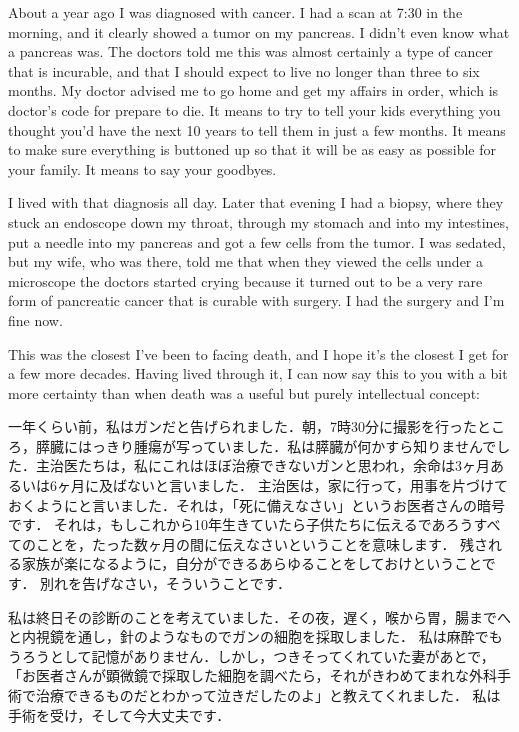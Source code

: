 \documentclass[twocolumn]{jsarticle}
\begin{document}
\newpage

About a year ago I was diagnosed with cancer. I had a scan at 7:30 in the morning, and it clearly showed a tumor on my pancreas. I didn't even know what a pancreas was. The doctors told me this was almost certainly a type of cancer that is incurable, and that I should expect to live no longer than three to six months. My doctor advised me to go home and get my affairs in order, which is doctor's code for prepare to die. It means to try to tell your kids everything you thought you'd have the next 10 years to tell them in just a few months. It means to make sure everything is buttoned up so that it will be as easy as possible for your family. It means to say your goodbyes.

I lived with that diagnosis all day. Later that evening I had a biopsy, where they stuck an endoscope down my throat, through my stomach and into my intestines, put a needle into my pancreas and got a few cells from the tumor. I was sedated, but my wife, who was there, told me that when they viewed the cells under a microscope the doctors started crying because it turned out to be a very rare form of pancreatic cancer that is curable with surgery. I had the surgery and I'm fine now.

This was the closest I've been to facing death, and I hope it's the closest I get for a few more decades. Having lived through it, I can now say this to you with a bit more certainty than when death was a useful but purely intellectual concept:

\newpage

一年くらい前，私はガンだと告げられました．朝，7時30分に撮影を行ったところ，膵臓にはっきり腫瘍が写っていました．私は膵臓が何かすら知りませんでした．主治医たちは，私にこれはほぼ治療できないガンと思われ，余命は3ヶ月あるいは6ヶ月に及ばないと言いました．
主治医は，家に行って，用事を片づけておくようにと言いました．それは，「死に備えなさい」というお医者さんの暗号です．
それは，もしこれから10年生きていたら子供たちに伝えるであろうすべてのことを，たった数ヶ月の間に伝えなさいということを意味します．
残される家族が楽になるように，自分ができるあらゆることをしておけということです．
別れを告げなさい，そういうことです．


\vspace{\baselineskip}

私は終日その診断のことを考えていました．その夜，遅く，喉から胃，腸までへと内視鏡を通し，針のようなものでガンの細胞を採取しました．
私は麻酔でもうろうとして記憶がありません．しかし，つきそってくれていた妻があとで，「お医者さんが顕微鏡で採取した細胞を調べたら，それがきわめてまれな外科手術で治療できるものだとわかって泣きだしたのよ」と教えてくれました．
私は手術を受け，そして今大丈夫です．
\end{document}
